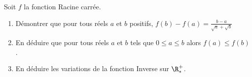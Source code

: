 
Soit $f$ la fonction Racine carrée.
 \begin{enumerate}
 \item Démontrer que pour tous réels $a$ et $b$ positifs, $f(b)-f(a)=\frac{b-a}{\sqrt{a}+\sqrt{b}}$ 
 \item En déduire que pour tous réels $a$ et $b$ tels que $0\leq a \leq b$ alors $f(a)\leq f(b)$ .
  \item En déduire les variations de la fonction Inverse sur $\R^+_*$.
 \end{enumerate}